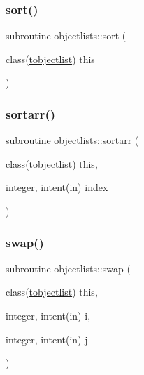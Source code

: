 \mbox{\label{namespaceobjectlists_ab62cea139392ebee550346a3f36a8448}} 
\subsubsection{\texorpdfstring{sort()}{sort()}}
{\footnotesize\ttfamily subroutine objectlists\+::sort (\begin{DoxyParamCaption}\item[{class(\mbox{\hyperlink{structobjectlists_1_1tobjectlist}{tobjectlist}})}]{this }\end{DoxyParamCaption})\hspace{0.3cm}{\ttfamily [private]}}

\mbox{\label{namespaceobjectlists_af5166a7a14ff75eca5eda21a454fe2a2}} 
\subsubsection{\texorpdfstring{sortarr()}{sortarr()}}
{\footnotesize\ttfamily subroutine objectlists\+::sortarr (\begin{DoxyParamCaption}\item[{class(\mbox{\hyperlink{structobjectlists_1_1tobjectlist}{tobjectlist}})}]{this,  }\item[{integer, intent(in)}]{index }\end{DoxyParamCaption})\hspace{0.3cm}{\ttfamily [private]}}

\mbox{\label{namespaceobjectlists_afbb87b678b2aa36260efbc57bb11a45b}} 
\subsubsection{\texorpdfstring{swap()}{swap()}}
{\footnotesize\ttfamily subroutine objectlists\+::swap (\begin{DoxyParamCaption}\item[{class(\mbox{\hyperlink{structobjectlists_1_1tobjectlist}{tobjectlist}})}]{this,  }\item[{integer, intent(in)}]{i,  }\item[{integer, intent(in)}]{j }\end{DoxyParamCaption})\hspace{0.3cm}{\ttfamily [private]}}

